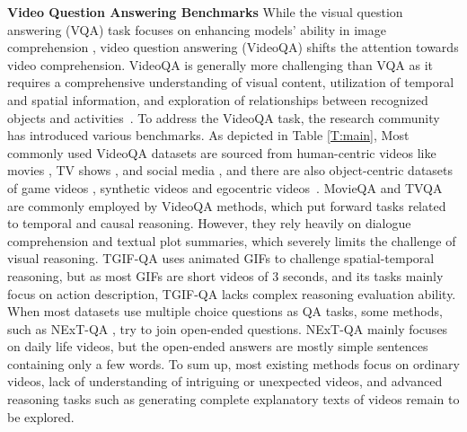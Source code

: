 
\noindent\textbf{Video Question Answering Benchmarks}\quad
While the visual question answering (VQA) task focuses on enhancing models' ability in image comprehension \cite{goyal2017making, zhu2016visual7w, krishna2016visual}, video question answering (VideoQA) shifts the attention towards video comprehension. VideoQA is generally more challenging than VQA as it requires a comprehensive understanding of visual content, utilization of temporal and spatial information, and exploration of relationships between recognized objects and activities~\cite{yi2020clevrer}. To address the VideoQA task, the research community has introduced various benchmarks. As depicted in Table \ref{T:main}, Most commonly used VideoQA datasets are sourced from human-centric videos like movies \cite{tapaswi2016movieqa}, TV shows \cite{lei2018tvqa, lei2019tvqa, garcia2020knowit}, and social media \cite{jang-IJCV-2019, zadeh2019social, xiao2021nextqanext, grundemclaughlin2021agqa, yang2022avqa, wu2021star, castro2022fiber}, and there are also object-centric datasets of game videos \cite{mun2017marioqa}, synthetic videos \cite{yi2020clevrer} and egocentric videos~\cite{Gao_2021_ICCV}. MovieQA \cite{tapaswi2016movieqa} and TVQA \cite{lei2018tvqa} are commonly employed by VideoQA methods, which put forward tasks related to temporal and causal reasoning. However, they rely heavily on dialogue comprehension and textual plot summaries, which severely limits the challenge of visual reasoning. TGIF-QA \cite{jang-IJCV-2019} uses animated GIFs to challenge spatial-temporal reasoning, but as most GIFs are short videos of 3 seconds, and its tasks mainly focus on action description, TGIF-QA lacks complex reasoning evaluation ability. When most datasets use multiple choice questions as QA tasks, some methods, such as NExT-QA \cite{xiao2021nextqanext}, try to join open-ended questions. NExT-QA mainly focuses on daily life videos, but the open-ended answers are mostly simple sentences containing only a few words. To sum up, most existing methods focus on ordinary videos, lack of understanding of intriguing or unexpected videos, and advanced reasoning tasks such as generating complete explanatory texts of videos remain to be explored.\\
